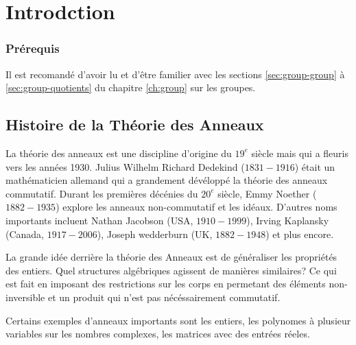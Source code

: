 \label{ch:ring}
\section{Introdction}
\label{sec:ring-intro}

\subsubsection{Prérequis}
Il est recomandé d'avoir lu et d'être familier avec les sections \ref{sec:group-group} à \ref{sec:group-quotients} du chapitre \ref{ch:group} sur les groupes.

\subsection{Histoire de la Théorie des Anneaux}
La théorie des anneaux est une discipline d'origine du $19^e$ siècle mais qui a fleuris vers les années 1930. Julius Wilhelm Richard Dedekind ($1831-1916$) était un mathématicien allemand qui a grandement dévéloppé la théorie des anneaux commutatif. Durant les premières décénies du $20^e$ siècle, Emmy Noether ($1882-1935$) explore les anneaux non-commutatif et les idéaux. D'autres noms importants incluent Nathan Jacobson (USA, $1910-1999$), Irving Kaplansky (Canada, $1917-2006$), Joseph wedderburn (UK, $1882-1948$) et plus encore.

La grande idée derrière la théorie des Anneaux est de généraliser les propriétés des entiers. Quel structures algébriques agissent de manières similaires? Ce qui est fait en imposant des restrictions sur les corps en permetant des éléments non-inversible et un produit qui n'est pas nécéssairement commutatif.

Certains exemples d'anneaux importants sont les entiers, les polynomes à plusieur variables sur les nombres complexes, les matrices avec des entrées réeles.

